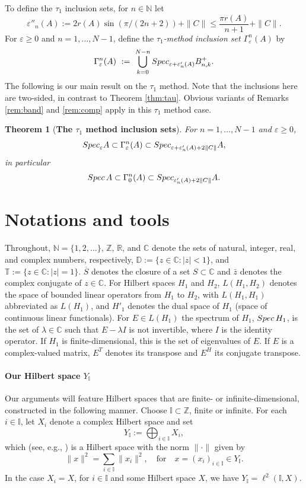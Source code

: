 \documentclass[preprint,1p,11pt]{elsarticle}
\newcommand\C{{\mathbb C}}
\newcommand\D{{\mathbb D}}
\newcommand\N{{\mathbb N}}
\newcommand\I{{\mathbb I}}
\newcommand\T{{\mathbb T}}
\newcommand\R{{\mathbb R}}
\newcommand\Z{{\mathbb Z}}
\newcommand\eps{{\varepsilon}}
\newcommand\Spec{{\rm Spec}\,}  %
\newcommand\Specn{{\rm Spec}}   %
\newcommand\Speps{{\rm Spec}_\eps}
\newtheorem{theorem}{Theorem}[section]
\numberwithin{equation}{section}   %
\numberwithin{figure}{section}  %
\begin{document}
To define the $\tau_1$ inclusion sets,  for $n\in \N$ let
\begin{equation} \label{eq:epstau1def}
\eps''_n(A) := 2r(A) \sin(\pi/(2n+2)) + \|C\| \leq \frac{\pi r(A)}{n+1} + \|C\|.
\end{equation}
For $\eps\geq 0$ and $n=1,\ldots,N-1$, define the {\it $\tau_1$-method inclusion set $\Gamma^{n}_{\eps}(A)$} by
\begin{equation} \label{eq:Gamdef}
 \Gamma_{\eps}^{n}(A)\ :=\ \bigcup_{k=0}^{N-n}%
\Specn_{\eps+\eps'_n(A)} B^{+}_{n,k}.%
\end{equation}
The following is our main result on the $\tau_1$ method. Note that the inclusions here are two-sided, in contrast to Theorem \ref{thm:tau}. Obvious variants of Remarks \ref{rem:band} and \ref{rem:comp} apply in this $\tau_1$ method case.
\begin{theorem}[\bf The $\tau_1$ method inclusion sets] \label{thm:tau1} For $n=1,\ldots,N-1$ and  $\eps\geq 0$,
$$
\Speps A \subset \Gamma^{n}_{\eps}(A) \subset \Specn_{\eps+\eps'_n(A)+2\|C\|}A, 
$$
in particular
$$\Spec A \subset  \Gamma^{n}_{0}(A)  \subset \Specn_{\eps'_n(A)+2\|C\|}A.$$
\end{theorem}
 
\section{Notations and tools} \label{sec:tools}
%
Throughout, $\N=\{1,2,\ldots\}$, $\Z$, $\R$, and $\C$ denote the sets of natural, integer, real, and complex numbers, respectively,
$\D:=\{z\in\C:|z|<1\}$, and $\T:=\{z\in\C:|z|=1\}$. $\overline S$ denotes the closure of a set $S\subset\C$ and $\bar z$ denotes the complex conjugate of $z\in \C$. For Hilbert spaces $H_1$ and $H_2$, $L(H_1,H_2)$ 
 denotes the space of bounded linear operators from $H_1$ to $H_2$, with $L(H_1,H_1)$ abbreviated as $L(H_1)$, and $H'_1$ denotes the dual space of $H_1$ (space of continuous linear functionals). For $E\in L(H_1)$ the spectrum of $H_1$, $\Spec H_1$, is the set of $\lambda\in \C$ such that $E-\lambda I$ is not invertible, where $I$ is the identity operator. If $H_1$ is finite-dimensional, this is the set of eigenvalues of $E$. If $E$ is a  complex-valued matrix, $E^T$ denotes its transpose and $E^H$ its conjugate transpose.

\paragraph{Our Hilbert space $Y_\I$} Our arguments will feature Hilbert spaces that are finite- or infinite-dimensional, constructed in the following manner. Choose $\I\subset \Z$, finite or infinite. For each $i\in \I$, let $X_i$ denote a complex Hilbert space and set 
\begin{equation} \label{eq:YI}
Y_\I := \bigoplus_{i\in \I}X_i,
\end{equation}
which (see, e.g., \cite[\S1.6]{ConwayFA}) is a Hilbert space with the norm $\|\cdot\|$ given by
$$
\|x\|^2 = \sum_{i\in \I} \|x_i\|^2,  \quad \mbox{for} \quad x=(x_i)_{i\in \I}\in Y_\I.
$$
 In the case $X_i=X$, for $i\in \I$ and some Hilbert space $X$,  we have $Y_\I = \ell^2(\I,X)$.  
\end{document}
